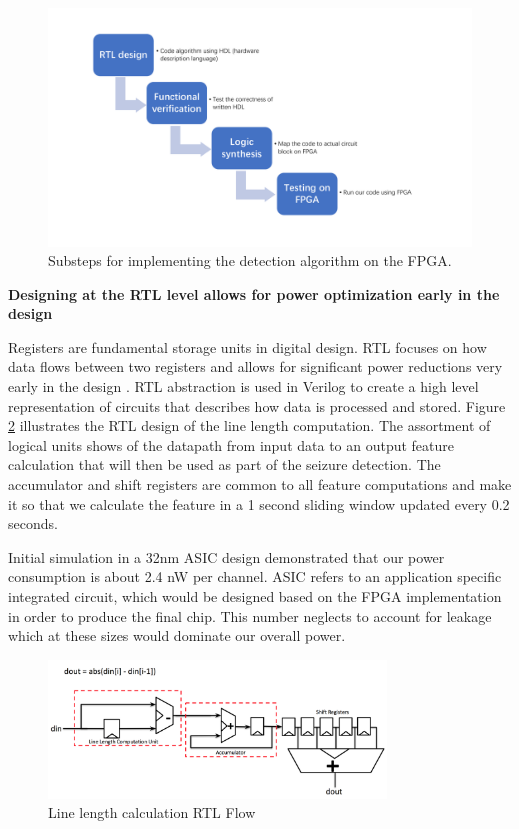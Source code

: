 \documentclass[usletter, 11pt]{extarticle}
\begin{document}
\begin{figure}[!ht]
	\centering
	\includegraphics[width = \textwidth]{img/Round6_HardwareDiagram_design_flow}
	\caption{Substeps for implementing the detection algorithm on the FPGA.}
	\label{fig:hardware_design_flow}
\end{figure}

\newpage
\vspace{11pt}
\textbf{Designing at the RTL level allows for power optimization early in the design}

Registers are fundamental storage units in digital design. RTL focuses on how data flows between two registers and allows for significant power reductions very early in the design \cite{najm1995}. RTL abstraction is used in Verilog to create a high level representation of circuits that describes how data is processed and stored. Figure \ref{fig:linelength_rtl} illustrates the RTL design of the line length computation. The assortment of logical units shows of the datapath from input data to an output feature calculation that will then be used as part of the seizure detection. The accumulator and shift registers are common to all feature computations and make it so that we calculate the feature in a 1 second sliding window updated every 0.2 seconds. 

Initial simulation in a 32nm ASIC design demonstrated that our power consumption is about 2.4 nW per channel. ASIC refers to an application specific integrated circuit, which would be designed based on the FPGA implementation in order to produce the final chip. This number neglects to account for leakage which at these sizes would dominate our overall power.

\begin{figure}[!h]
	\centering
	\includegraphics[width = 0.8\textwidth]{img/LL_RTL.png}
	\caption{Line length calculation RTL Flow} 
	\label{fig:linelength_rtl}
\end{figure}
\end{document}
